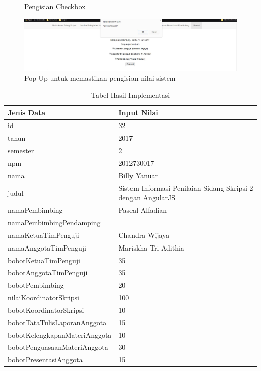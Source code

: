 \begin{itemize}
\begin{figure}[H]
			\caption{Pengisian Checkbox}
			\label{tab: hasilPeng}
		\end{figure}
	\begin{figure}[H]
		\centering
		\includegraphics[scale=0.4]{Gambar/selesaiisi2}
		\caption{Pop Up untuk memastikan pengisian nilai sistem}
		\label{tab: hasilPeng2}
	\end{figure}
		\begin{table}[htbp]
			\centering
			\caption{Tabel Hasil Implementasi}
			\begin{tabular}{| m{7cm} | m{5cm} |}
				\hline
				Jenis Data & Input Nilai\\
				\hline
				id & 32\\
				\hline
				tahun & 2017\\
				\hline
				semester & 2\\
				\hline
				npm & 2012730017\\
				\hline
				nama & Billy Yanuar\\
				\hline
				judul & Sistem Informasi Penilaian Sidang Skripsi 2 dengan AngularJS\\
				\hline
				namaPembimbing & Pascal Alfadian\\
				\hline
				namaPembimbingPendamping & \\
				\hline
				namaKetuaTimPenguji & Chandra Wijaya\\
				\hline
				namaAnggotaTimPenguji & Mariskha Tri Adithia\\
				\hline
				bobotKetuaTimPenguji & 35\\
				\hline
				bobotAnggotaTimPenguji & 35\\
				\hline
				bobotPembimbing & 20\\
				\hline
				nilaiKoordinatorSkripsi & 100\\
				\hline
				bobotKoordinatorSkripsi & 10\\
				\hline
				bobotTataTulisLaporanAnggota & 15\\
				\hline
				bobotKelengkapanMateriAnggota & 10\\
				\hline
				bobotPenguasaanMateriAnggota & 30\\
				\hline
				bobotPresentasiAnggota & 15\\

\end{tabular}
\end{table}
\end{itemize}
